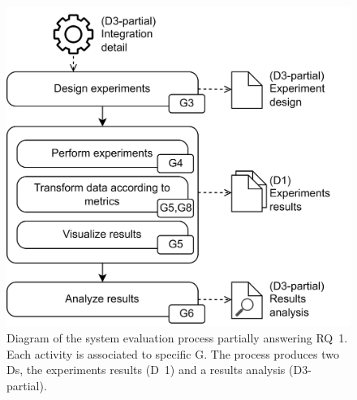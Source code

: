 \begin{figure}[!ht]
    \begin{center}
    \includegraphics[width=\textwidth]{figures/3-method/method_exp.png}
    \caption[System evaluation process]{Diagram of the system evaluation process partially answering \gls{RQ}~1. Each activity is associated to specific \gls{G}. The process produces two \glspl{D}, the experiments results (\gls{D}~1) and a results analysis (\gls{D}3-partial).}
    \label{fig:method_experiments}
    \end{center}
\end{figure}